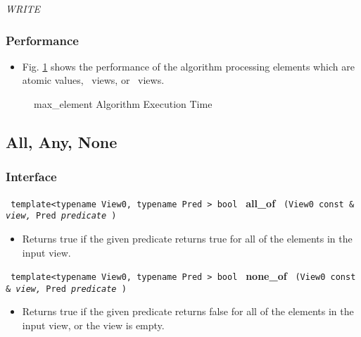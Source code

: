 \textit{WRITE}

\subsubsection{Performance} %

\begin{itemize}
\item
Fig. \ref{fig:maxelem-alg-exec-exper}
shows the performance of the algorithm processing
elements which are atomic values, \stl\ views, or \stapl\ views.
\end{itemize}

\begin{figure}[p]
\caption{max\_element Algorithm Execution Time}
\label{fig:maxelem-alg-exec-exper}
\end{figure}



\subsection{All, Any, None} \label{sec-sumry-bool-red}

\subsubsection{Interface} %

\noindent
\texttt{%
template<typename View0, typename Pred >
\newline
bool 
}
\newline
\textbf{all\_of}%
\texttt{%
(View0 const \&
\textit{view,}%
Pred 
\textit{predicate}%
)
}

\begin{itemize}
\item
Returns true if the given predicate returns true for all of the elements in the input view. 
\end{itemize}
 
\noindent
\texttt{%
template<typename View0, typename Pred >
\newline
bool 
}
\newline
\textbf{none\_of}%
\texttt{%
(View0 const \&
\textit{view,}%
Pred 
\textit{predicate}%
)
}

\begin{itemize}
\item
Returns true if the given predicate returns false for all of the elements in the input view, or the view is empty. 
\end{itemize}
 
